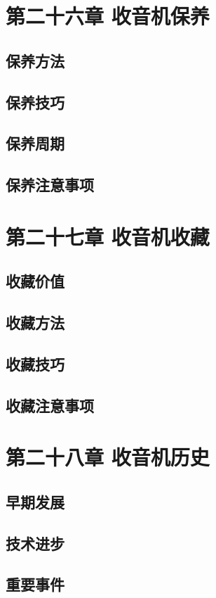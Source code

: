 \documentclass[12pt,UTF8]{ctexbook}
\begin{document}
\chapter{第二十六章 收音机保养}

\section{保养方法}
\section{保养技巧}
\section{保养周期}
\section{保养注意事项}

\chapter{第二十七章 收音机收藏}

\section{收藏价值}
\section{收藏方法}
\section{收藏技巧}
\section{收藏注意事项}

\chapter{第二十八章 收音机历史}

\section{早期发展}
\section{技术进步}
\section{重要事件}
\end{document}

